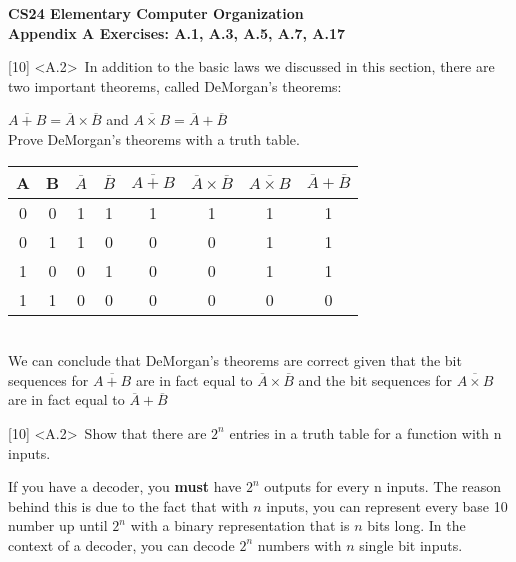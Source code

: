\documentclass[12pt]{article}
\begin{document}
	\begin{center}
		\textbf{CS24 Elementary Computer Organization} \\
		\textbf{Appendix A Exercises: A.1, A.3, A.5, A.7, A.17} \vspace{0.5cm}
	\end{center}
	
	
	
	\noindent {} 
	[10] \textless A.2\textgreater \ In addition to the basic laws we discussed in this section, there are two important theorems, called DeMorgan's theorems: \\
	\begin{center}
		$\overline{A+B} = \overline{A}\times \overline{B}$ and $\overline{A \times B} = \overline{A} + \overline{B}$ \vspace{0.5cm} \\
		
		Prove DeMorgan's theorems with a truth table. \vspace{0.2cm} \\
		\begin{tabular}{ |c|c|c|c|c|c|c|c| } 
			\hline
			A & B & $\overline{A}$ & $\overline{B}$ & $\overline{A + B}$ & $\overline{A} \times \overline{B}$ & $\overline{A \times B}$ & $\overline{A} + \overline{B}$\\
			\hline
			0 & 0 & 1 & 1 & 1 & 1 & 1 & 1 \\ 
			\hline
			0 & 1 & 1 & 0 & 0 & 0 & 1 & 1 \\ 
			\hline
			1 & 0 & 0 & 1 & 0 & 0 & 1 & 1 \\ 
			\hline
			1 & 1 & 0 & 0 & 0 & 0 & 0 & 0 \\ 
			\hline
		\end{tabular}
		\vspace{0.8cm} \\
		
		We can conclude that DeMorgan's theorems are correct given that the bit sequences for $\overline{A+B}$ are in fact equal to $\overline{A}\times \overline{B}$ and the bit sequences for $\overline{A \times B}$ are in fact equal to $\overline{A} + \overline{B}$
		
	\end{center}
	
	
	
	
	
	\newpage
	
	
	
	
	
	\noindent {} 
	[10] \textless A.2\textgreater \ Show that there are $2^n$ entries in a truth table for a function with n inputs. \\
	\begin{center}
		If you have a decoder, you \textbf{must} have $2^n$ outputs for every n inputs. The reason behind this is due to the fact that with $n$ inputs, you can represent every base 10 number up until $2^n$ with a binary representation that is $n$ bits long. In the context of a decoder, you can decode $2^n$ numbers with $n$ single bit inputs. \\
	\end{center}
	
\end{document}
